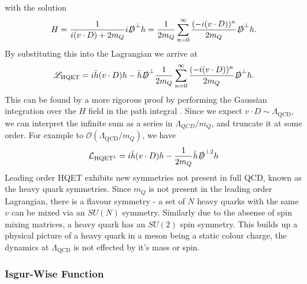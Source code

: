 with the solution
\begin{align}
	H = {1\over i(v\cdot D) + 2m_Q} i\slashed{D}^{\perp} h = {1\over 2m_Q}\sum_{n=0}^{\infty} {(-i(v\cdot D))^n\over 2m_Q} \slashed{D}^{\perp} h.
\end{align}
By substituting this into the Lagrangian we arrive at
\begin{align}
	\mathscr{L}_{\text{HQET}} = i \bar{h} (v\cdot D) h - \bar{h} \slashed{D}^{\perp} {1\over 2m_Q}\sum_{n=0}^{\infty} {(-i(v\cdot D))^n\over 2m_Q} \slashed{D}^{\perp} h.
\end{align}
This can be found by a more rigorous proof by performing the Gaussian integration over the $H$ field in the path integral {\color{red}{ref!}}. Since we expect $v\cdot D \sim \Lambda_{\text{QCD}}$, we can interpret the infinite sum as a series in $\Lambda_{QCD}/m_Q$, and truncate it at some order. For example to $\mathcal{O}(\Lambda_{\text{QCD}}/m_Q)$, we have
\begin{align}
	\mathcal{L}_{\text{HQET}^1} = i \bar{h} (v\cdot D) h - {1\over 2m_Q} \bar{h} \slashed{D}^{\perp 2} h
	\label{eq:HQET1}
\end{align}
 Leading order HQET exhibits new symmetries not present in full QCD, known as the heavy quark symmetries. Since $m_Q$ is not present in the leading order Lagrangian, there is a flavour symmetry - a set of $N$ heavy quarks with the same $v$ can be mixed via an $SU(N)$ symmetry. Similarly due to the absense of spin mixing matrices, a heavy quark has an $SU(2)$ spin symmetry. This builds up a physical picture of a heavy quark in a meson being a static colour charge, the dynamics at $\Lambda_{\text{QCD}}$ is not effected by it's mass or spin.

\subsubsection{Isgur-Wise Function}
\label{sec:isgurwise}

